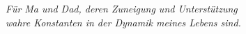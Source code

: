 \thispagestyle{empty}
{}

\vspace*{5cm}

\begin{center}

\textit{Für Ma und Dad, deren Zuneigung und Unterstützung\\ wahre Konstanten in der Dynamik meines Lebens sind.}



\end{center}
